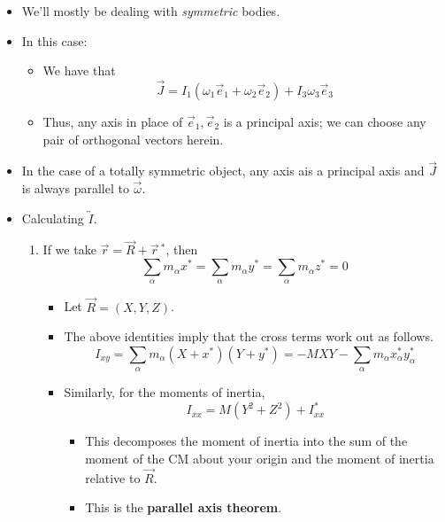 \documentclass[../notes.tex]{subfiles}
\begin{document}
\begin{itemize}
\begin{itemize}
    \end{itemize}
    \item We'll mostly be dealing with \emph{symmetric} bodies.
    \item In this case:
    \begin{itemize}
        \item We have that
        \begin{equation*}
            \vec{J} = I_1(\omega_1\vec{e}_1+\omega_2\vec{e}_2)+I_3\omega_3\vec{e}_3
        \end{equation*}
        \item Thus, any axis in place of $\vec{e}_1,\vec{e}_2$ is a principal axis; we can choose any pair of orthogonal vectors herein.
    \end{itemize}
    \item In the case of a totally symmetric object, any axis ais a principal axis and $\vec{J}$ is always parallel to $\vec{\omega}$.
    \item Calculating $\overleftrightarrow{I}$.
    \begin{enumerate}
        \item If we take $\vec{r}=\vec{R}+\vec{r}{\,}^*$, then
        \begin{equation*}
            \sum_\alpha m_\alpha x^* = \sum_\alpha m_\alpha y^* = \sum_\alpha m_\alpha z^* = 0
        \end{equation*}
        \begin{itemize}
            \item Let $\vec{R}=(X,Y,Z)$.
            \item The above identities imply that the cross terms work out as follows.
            \begin{equation*}
                I_{xy} = \sum_\alpha m_\alpha(X+x^*)(Y+y^*)
                = -MXY-\sum_\alpha m_\alpha x_\alpha^*y_\alpha^*
            \end{equation*}
            \item Similarly, for the moments of inertia,
            \begin{equation*}
                I_{xx} = M(Y^2+Z^2)+I_{xx}^*
            \end{equation*}
            \begin{itemize}
                \item This decomposes the moment of inertia into the sum of the moment of the CM about your origin and the moment of inertia relative to $\vec{R}$.
                \item This is the \textbf{parallel axis theorem}.

\end{itemize}
\end{itemize}
\end{enumerate}
\end{itemize}
\end{document}

